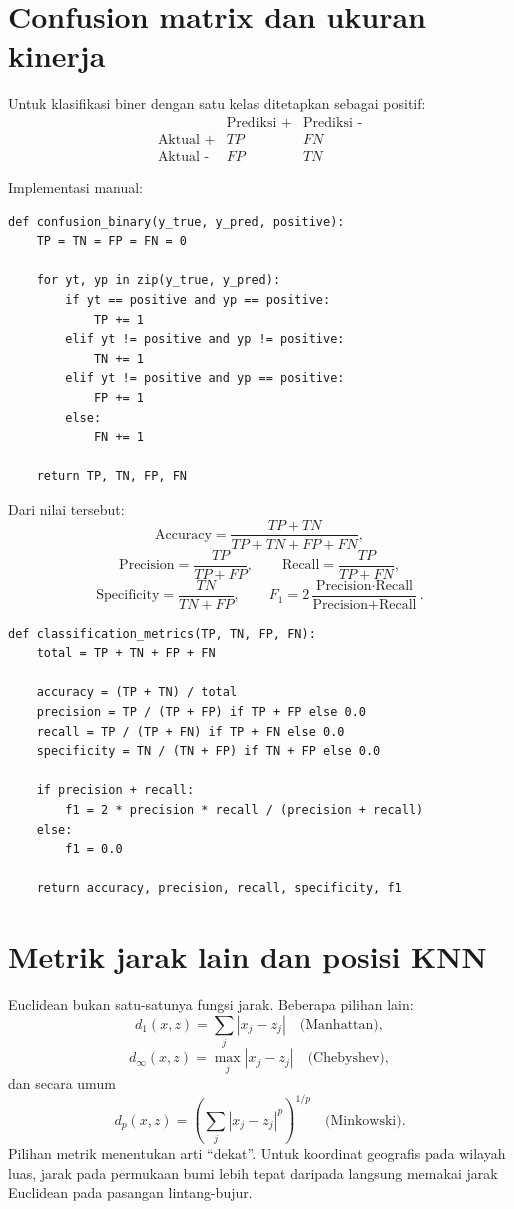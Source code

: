 \documentclass[11pt,a4paper]{report}
\begin{document}
\section{Confusion matrix dan ukuran kinerja}
Untuk klasifikasi biner dengan satu kelas ditetapkan sebagai positif:
\[
\begin{array}{c|cc}
 & \text{Prediksi +} & \text{Prediksi -}\\ \hline
\text{Aktual +} & TP & FN\\
\text{Aktual -} & FP & TN
\end{array}
\]

Implementasi manual:
\begin{lstlisting}
def confusion_binary(y_true, y_pred, positive):
    TP = TN = FP = FN = 0

    for yt, yp in zip(y_true, y_pred):
        if yt == positive and yp == positive:
            TP += 1
        elif yt != positive and yp != positive:
            TN += 1
        elif yt != positive and yp == positive:
            FP += 1
        else:
            FN += 1

    return TP, TN, FP, FN
\end{lstlisting}

Dari nilai tersebut:
\[
\text{Accuracy}
=
\frac{TP+TN}{TP+TN+FP+FN},
\]
\[
\text{Precision}
=
\frac{TP}{TP+FP},
\qquad
\text{Recall}
=
\frac{TP}{TP+FN},
\]
\[
\text{Specificity}
=
\frac{TN}{TN+FP},
\qquad
F_1
=
2\frac{\text{Precision}\cdot\text{Recall}}
{\text{Precision}+\text{Recall}}.
\]

\begin{lstlisting}
def classification_metrics(TP, TN, FP, FN):
    total = TP + TN + FP + FN

    accuracy = (TP + TN) / total
    precision = TP / (TP + FP) if TP + FP else 0.0
    recall = TP / (TP + FN) if TP + FN else 0.0
    specificity = TN / (TN + FP) if TN + FP else 0.0

    if precision + recall:
        f1 = 2 * precision * recall / (precision + recall)
    else:
        f1 = 0.0

    return accuracy, precision, recall, specificity, f1
\end{lstlisting}

\section{Metrik jarak lain dan posisi KNN}
Euclidean bukan satu-satunya fungsi jarak. Beberapa pilihan lain:
\[
d_1(x,z)=\sum_j|x_j-z_j|
\quad\text{(Manhattan)},
\]
\[
d_\infty(x,z)=\max_j|x_j-z_j|
\quad\text{(Chebyshev)},
\]
dan secara umum
\[
d_p(x,z)
=
\left(\sum_j|x_j-z_j|^p\right)^{1/p}
\quad\text{(Minkowski)}.
\]
Pilihan metrik menentukan arti ``dekat''. Untuk koordinat geografis pada wilayah luas, jarak pada permukaan bumi lebih tepat daripada langsung memakai jarak Euclidean pada pasangan lintang-bujur.
\end{document}
